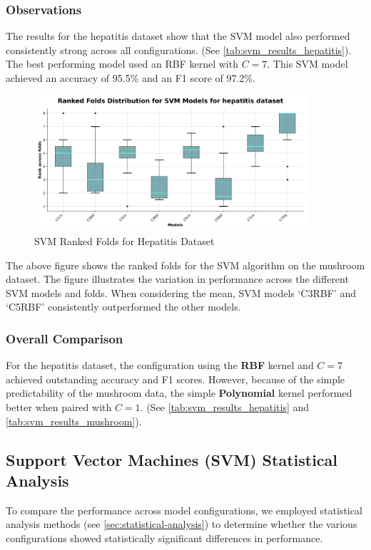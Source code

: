 \subsubsection*{Observations}
The results for the hepatitis dataset show that the SVM model also performed consistently strong across all configurations.
(See \autoref{tab:svm_results_hepatitis}).
The best performing model used an RBF kernel with $C=7$.
This SVM model achieved an accuracy of 95.5\% and an F1 score of 97.2\%.

\begin{figure}
    \centering
    \includegraphics[width=0.9\textwidth]{figures/ranked_folds_SVM_hepatitis.png}
    \caption{SVM Ranked Folds for Hepatitis Dataset}
    \label{fig:ranked_folds_SVM_hepatitis}
\end{figure}

The above figure shows the ranked folds for the SVM algorithm on the mushroom dataset.
The figure illustrates the variation in performance across the different SVM models and folds.
When considering the mean, SVM models `C3RBF' and `C5RBF' consistently outperformed the other models.

\subsubsection*{Overall Comparison}
For the hepatitis dataset, the configuration using the \textbf{RBF} kernel and $C=7$
achieved outstanding accuracy and F1 scores. However, because of the simple predictability
of the mushroom data, the simple \textbf{Polynomial} kernel performed better when paired with $C=1$.
(See \autoref{tab:svm_results_hepatitis} and \autoref{tab:svm_results_mushroom}).

\subsection*{Support Vector Machines (SVM) Statistical Analysis}
To compare the performance across model configurations, we employed statistical analysis methods
(see \autoref{sec:statistical-analysis}) to determine whether the various configurations showed
statistically significant differences in performance.

